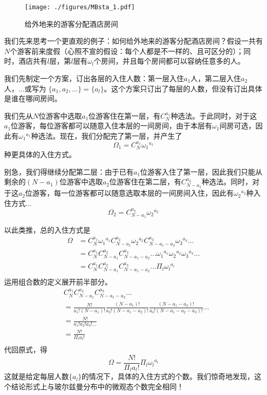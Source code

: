 \begin{example}{}
\begin{figure}[ht]
\centering
\texttt{[image: ./figures/MBsta\_1.pdf]}
\caption{给外地来的游客分配酒店房间} \label{fig_MBsta_1}
\end{figure}
我们先来思考一个更直观的例子：如何给外地来的游客分配酒店房间？假设一共有$N$个游客前来度假（心照不宣的假设：每个人都是不一样的、且可区分的）；同时，酒店共有$l$层，第$l$层有$\omega_l$个房间，并且每个房间都可以容纳任意多的人。

我们先制定一个方案，订出各层的入住人数：第一层入住$a_1$人，第二层入住$a_2$人，...或写为 $\{a_1,a_2,...\}=\{a_l\}$。这个方案只订出了每层的人数，但没有订出具体是谁在哪间房间。

我们先从$N$位游客中选取$a_1$位游客住在第一层，有$C_N^{a_1}$种选法。于此同时，对于这$a_1$位游客，每位游客都可以随意入住本层的一间房间，由于本层有$\omega_1$间房可选，因此有${\omega_1}^{a_1}$种选法。现在，我们分配完了第一层，并产生了$$\Omega_1 = C_N^{a_1} {\omega_1}^{a_1}$$种更具体的入住方式。

别急，我们得继续分配第二层：由于已有$a_1$位游客入住了第一层，因此我们只能从剩余的$(N-a_1)$位游客中选取$a_2$位游客住在第二层，有$C_{N-a_1}^{a_2}$种选法。同时，对于这$a_2$位游客，每一位游客都可以随意选取本层的一间房间入住，因此有${\omega_2}^{a_2}$种入住方式...
$$\Omega_2 = C_{N-a_1}^{a_2} {\omega_2}^{a_2}$$

以此类推，总的入住方式是
$$
\begin{aligned}
\Omega &= C_N^{a_1} {\omega_1}^{a_1} C_{N-a_1}^{a_2} {\omega_2}^{a_2} C_{N-a_1-a_2}^{a_3} {\omega_3}^{a_3}...\\
&=C_N^{a_1} C_{N-a_1}^{a_2} C_{N-a_1-a_2}^{a_3} ... {\omega_1}^{a_1}{\omega_2}^{a_2}  {\omega_3}^{a_3}...\\
& = C_N^{a_1} C_{N-a_1}^{a_2} C_{N-a_1-a_2}^{a_3} ... \Pi_l{\omega_l}^{a_l}\\
\end{aligned}
$$
运用组合数的定义展开前半部分。
$$
\begin{aligned}
& C_N^{a_1} C_{N-a_1}^{a_2} C_{N-a_1-a_2}^{a_3} ...\\
&= \frac{N!}{a_1!(N-a_1)!} 
\frac{(N-a_1)!}{a_2!(N-a_1-a_2)!}
\frac{(N-a_1-a_2)!}{a_3!(N-a_1-a_2-a_3)!}
...\\
&=\frac{N!}{a_1!a_2!a_3!...} \\
&=\frac{N!}{\Pi_l a_l!} \\
\end{aligned}
$$
代回原式，得
$$
\Omega = \frac{N!}{\Pi_l a_l!}  \Pi_l{\omega_l}^{a_l}
$$
这就是给定每层人数$\{a_l\}$的情况下，具体的入住方式的个数。我们惊奇地发现，这个结论形式上与玻尔兹曼分布中的微观态个数完全相同！


\end{example}
